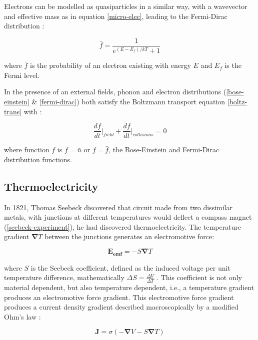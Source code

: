 \documentclass[12pt,draft]{article}
\renewcommand{\vec}[1]{\mathbf{#1}}
\begin{document}
Electrons can be modelled as quasiparticles in a similar way, with a wavevector and effective mass as in equation \eqref{micro-elec}, leading to the Fermi-Dirac distribution \cite{kittel}:

\begin{equation}
\label{fermi-dirac}
	 \bar{f} = \frac{1}{e^{(E - E_f) / k T} + 1}
\end{equation}

where $\bar{f}$ is the probability of an electron existing with energy $E$ and $E_f$ is the Fermi level.

In the presence of an external fields, phonon and electron
distributions (\eqref{bose-einstein} \& \eqref{fermi-dirac}) both
satisfy the Boltzmann transport equation \eqref{boltz-trans} with \cite{ziman}:

\begin{equation}
\label{boltz-specific}
	\frac{df}{dt}\bigg|_{field} + \frac{df}{dt}\bigg|_{collisions} = 0
\end{equation}

where function $f$ is $f = \bar{n}$ or $f = \bar{f}$, the Bose-Einstein and Fermi-Dirac distribution functions.

\subsection{Thermoelectricity}
In 1821, Thomas Seebeck discovered that circuit made from two dissimilar metals, with junctions at different temperatures would deflect a compass magnet (\ref{seebeck-experiment}), he had discovered thermoelectricity. The temperature gradient $\vec{\nabla} T$ between the junctions generates an electromotive force:

\begin{equation}
\label{seebeck-emf}
	\vec{E_{emf}} = -S \vec{\nabla} T
\end{equation}

where $S$ is the Seebeck coefficient, defined as the induced voltage per unit temperature difference, mathematically $\Delta S = \frac{\Delta V}{\Delta T}$ \cite{auparay}. This coefficient is not only material dependent, but also temperature dependent, i.e., a temperature gradient produces an electromotive force gradient. This electromotive force gradient produces a current density gradient described macroscopically by a modified Ohm's law \cite{ziman}:

\begin{equation}
\label{current-density}
	\vec{J} = \sigma (-\vec{\nabla} V - S \vec{\nabla} T)
\end{equation}
\end{document}
